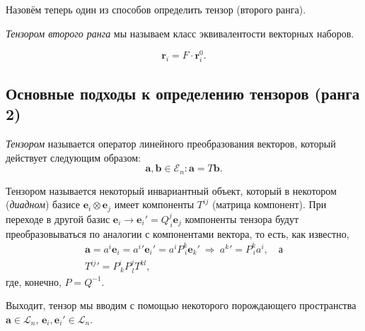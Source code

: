 Назовём теперь один из способов определить тензор (второго ранга).
\begin{definition}
  \emph{Тензором второго ранга} мы называем класс эквивалентости векторных наборов.
\end{definition}

\[
  \mathbf{r}_i = F \cdot \mathbf{r}_i^0.
\]



\subsection{Основные подходы к определению тензоров (ранга 2)}
\begin{definition}[алгебраическое]
  \label{tensor-def}
  \emph{Тензором} называется оператор линейного преобразования векторов,
  который действует следующим образом:
  \[
    \mathbf{a}, \mathbf{b} \in \mathcal{E}_n\colon \mathbf{a} = T \mathbf{b}.
  \]
\end{definition}

\renewcommand{\thedefinition}{\ref{tensor-def}$'$}
\addtocounter{definition}{-1}
\begin{definition}
  Тензором называется некоторый инвариантный объект, который в некотором (\emph{диадном}) базисе
   $\mathbf{e}_i \otimes \mathbf{e}_j$ имеет компоненты $T^{ij}$ (матрица компонент).
  При переходе в другой базис $\mathbf{e}_i \to \mathbf{e}_i' = Q^j_{\, i} \mathbf{e}_j$ компоненты тензора
  будут преобразовываться по аналогии с компонентами вектора, то есть, как
  известно,
  \begin{gather*}
    \mathbf{a} = a^i \mathbf{e}_i = {a^i}' {\mathbf{e}_i}' = a^i P^k_{\,i} \mathbf{e}_k'
    \ \Rightarrow \ 
    {a^k}' = P^k_{\, i} a^i, \quad \text{а}\\
    {T^{ij}}' = P^i_{\, k} P^j_{\, l} T^{kl},
  \end{gather*}
  где, конечно, $ P = Q^{-1} $.
\end{definition}
\renewcommand{\thedefinition}{\arabic{definition}}

Выходит, тензор мы вводим с помощью некоторого порождающего пространства
$\mathbf{a} \in \mathcal{L}_n$, $\mathbf{e}_i, \mathbf{e}_i' \in \mathcal{L}_n$.

